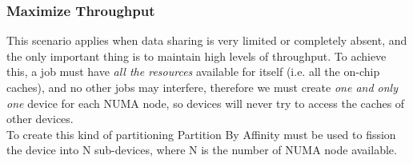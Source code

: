 \subsubsection{Maximize Throughput}
This scenario applies when data sharing is very limited or completely absent, and the only important thing is to maintain high levels of throughput. To achieve this, a job must have \textit{all the resources} available for itself (i.e. all the on-chip caches), and no other jobs may interfere, therefore we must create \emph{one and only one} device for each NUMA node, so devices will never try to access the caches of other devices.\\
To create this kind of partitioning Partition By Affinity must be used to fission the device into N sub-devices, where N is the number of NUMA node available.

\vfill
\columnbreak







